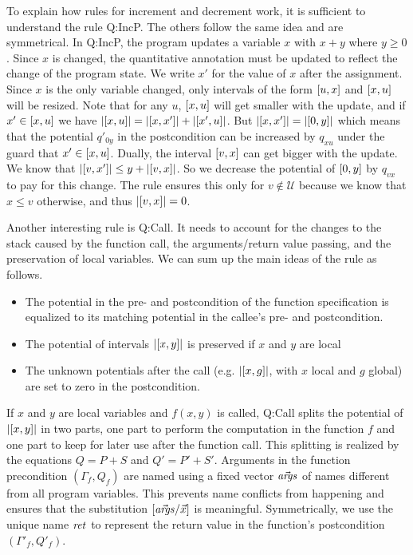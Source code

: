 \documentclass[nocopyrightspace,preprint,pldi]{sigplanconf-pldi15}
\newcommand{\iffull}[2]{\ifx\fullversion\undefined{#2}\else{#1}\fi}
\newcommand{\ifshort}[2]{\ifx\fullversion\undefined{#1}\else{#2}\fi}
\newcommand{\itemskip}[0]{\ifshort{\vspace{-3pt}}{}}
\newcommand{\itemskipIn}[0]{\ifshort{\vspace{-1pt}}{}}
\begin{document}
To explain how rules for increment and decrement work, it is
sufficient to understand the rule {\sc Q:IncP}.  The others follow the
same idea and are symmetrical.  In {\sc Q:IncP}, the program updates a
variable $x$ with $x+y$ where $y \ge 0$.  Since $x$ is changed, the
quantitative annotation must be updated to reflect the change of the
program state.  We write $x'$ for the value of $x$ after the assignment.
Since $x$ is the only variable changed, only intervals of the form
$[u,x]$ and $[x,u]$ will be resized.  Note that for any $u$,
$[x,u]$ will get smaller with the update, and if $x' \in [x,u]$ we have $|[x,u]| = |[x,x']| + |[x',u]|$.  But
$|[x,x']| = |[0,y]|$ which means that the potential
$q'_{0y}$ in the postcondition can be increased by $q_{xu}$ under the
guard that $x' \in [x,u]$.  Dually, the interval $[v,x]$ can
get bigger with the update.  We know that $|[v,x']| \le y +
|[v,x]|$.  So we decrease the potential of $[0,y]$ by
$q_{vx}$ to pay for this change.  The rule ensures this
only for $v \not\in \mathcal U$ because we know that $x \le v$
otherwise, and thus $|[v,x]| = 0$.

Another interesting rule is {\sc Q:Call}.  It needs to account for the
changes to the stack caused by the function call, the arguments/return
value passing, and the preservation of local variables.  We can sum up
the main ideas of the rule as follows.
\itemskip
\begin{itemize}
\item The potential in the pre- and postcondition of the function
  specification is equalized to its matching potential in the callee's
  pre- and postcondition.
\itemskipIn
\item
  $\!$The potential of intervals $|[x,y]|$ is preserved
  if $x$ and $y$ are local\iffull{ variables.}{.}
\item
  The unknown potentials after the call (e.g.
  $|[x,g]|$, with $x$ local and $g$ global)
  are set to zero in the postcondition.
\end{itemize}
\itemskip
If $x$ and $y$ are local variables and $f(x,y)$ is
called, {\sc Q:Call} splits the potential of
$|[x,y]|$ in two parts, one part to perform the
computation in the function $f$ and one part to keep for
later use after the function call.  This splitting is
realized by the equations $Q = P {+} S$ and $Q' =
P' {+} S'$.  Arguments in the function precondition
$(\Gamma_f, Q_f)$ are named using a fixed vector ${\vec {\mathit{args}}}$
of names different from all program variables.  This
prevents name conflicts from happening and ensures that
the substitution $[{\vec {\mathit{args}}}/\vec x]$ is meaningful.
Symmetrically, we use the unique name ${\mathit{ret}}$ to represent
the return value in the function's postcondition
$(\Gamma'_f, Q'_f)$.
\end{document}
